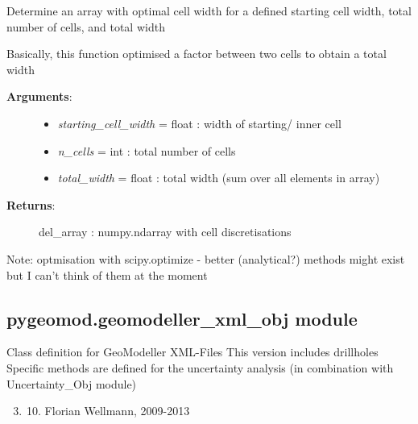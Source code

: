 \documentclass[letterpaper,10pt,english]{sphinxmanual}
\begin{document}

\begin{fulllineitems}
\label{pygeomod:pygeomod.geogrid.optimial_cell_increase}
Determine an array with optimal cell width for a defined starting cell width,
total number of cells, and total width

Basically, this function optimised a factor between two cells to obtain a total
width
\begin{description}
\item[{\textbf{Arguments}:}] \leavevmode\begin{itemize}
\item {} 
\emph{starting\_cell\_width} = float : width of starting/ inner cell

\item {} 
\emph{n\_cells} = int : total number of cells

\item {} 
\emph{total\_width} = float : total width (sum over all elements in array)

\end{itemize}

\item[{\textbf{Returns}:}] \leavevmode
del\_array : numpy.ndarray with cell discretisations

\end{description}

Note: optmisation with scipy.optimize - better (analytical?) methods might exist but
I can't think of them at the moment

\end{fulllineitems}



\subsection{pygeomod.geomodeller\_xml\_obj module}
\label{pygeomod:pygeomod-geomodeller-xml-obj-module}\label{pygeomod:module-pygeomod.geomodeller_xml_obj}
Class definition for GeoModeller XML-Files
This version includes drillholes
Specific methods are defined for the uncertainty analysis (in combination
with Uncertainty\_Obj module)
\begin{enumerate}
\setcounter{enumi}{2}
\item {} \begin{enumerate}
\setcounter{enumi}{9}
\item {} 
Florian Wellmann, 2009-2013

\end{enumerate}

\end{enumerate}
\end{document}

